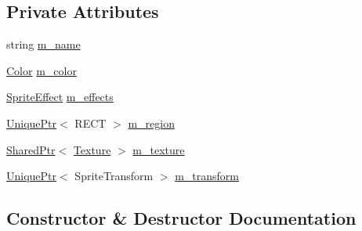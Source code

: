\subsection*{Private Attributes}
\begin{DoxyCompactItemize}
\item 
string \hyperlink{classmage_1_1_sprite_image_af172c204ee34926cc1dbead8351de817}{m\+\_\+name}
\item 
\hyperlink{structmage_1_1_color}{Color} \hyperlink{classmage_1_1_sprite_image_a63331a3170f5af1a14b15913afc59ce2}{m\+\_\+color}
\item 
\hyperlink{namespacemage_a9cfe18123066ba4236f548f9de75d881}{Sprite\+Effect} \hyperlink{classmage_1_1_sprite_image_a4233e0143d4dd0b609e38f5cbd3aef98}{m\+\_\+effects}
\item 
\hyperlink{namespacemage_a8c307fbcc33bce9b7f2aa4c26c3b95cf}{Unique\+Ptr}$<$ R\+E\+CT $>$ \hyperlink{classmage_1_1_sprite_image_a936aed1b97b91378724702c33eaf30be}{m\+\_\+region}
\item 
\hyperlink{namespacemage_a1e01ae66713838a7a67d30e44c67703e}{Shared\+Ptr}$<$ \hyperlink{classmage_1_1_texture}{Texture} $>$ \hyperlink{classmage_1_1_sprite_image_a8416fc862782dc019e15275261e7ca15}{m\+\_\+texture}
\item 
\hyperlink{namespacemage_a8c307fbcc33bce9b7f2aa4c26c3b95cf}{Unique\+Ptr}$<$ Sprite\+Transform $>$ \hyperlink{classmage_1_1_sprite_image_adcb9c0c4437cc9fe90957044cb8b76c0}{m\+\_\+transform}
\end{DoxyCompactItemize}


\subsection{Constructor \& Destructor Documentation}
\hypertarget{classmage_1_1_sprite_image_a11448d089eb7a52002faa59fe6600182}{}\label{classmage_1_1_sprite_image_a11448d089eb7a52002faa59fe6600182} 
